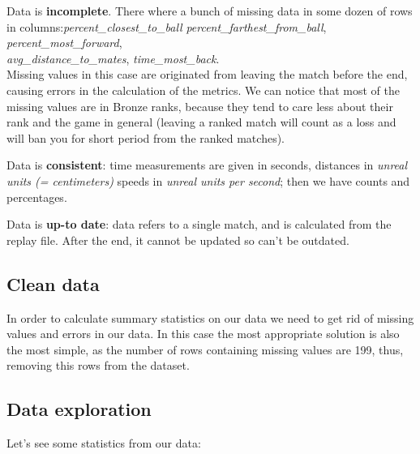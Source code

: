 Data is \textbf{incomplete}. There where a bunch of missing data in some dozen of rows in columns:\textit{percent\_closest\_to\_ball} \textit{percent\_farthest\_from\_ball}, \textit{percent\_most\_forward}, \\ \textit{avg\_distance\_to\_mates}, \textit{time\_most\_back}. \\
Missing values in this case are originated from leaving the match before the end, causing errors in the calculation of the metrics. We can notice that most of the missing values are in Bronze ranks, because they tend to care less about their rank and the game in general (leaving a ranked match will count as a loss and will ban you for short period from the ranked matches).

Data is \textbf{consistent}: time measurements are given in seconds, distances in \textit{unreal units (= centimeters)} speeds in \textit{unreal units per second}; then we have counts and percentages.

Data is \textbf{up-to date}: data refers to a single match, and is calculated from the replay file. After the end, it cannot be updated so can't be outdated.

\subsection{Clean data}

In order to calculate summary statistics on our data we need to get rid of missing values and errors in our data.
In this case the most appropriate solution is also the most simple, as the number of rows containing missing values are 199, thus, removing this rows from the dataset.

\subsection{Data exploration}

Let's see some statistics from our data:


